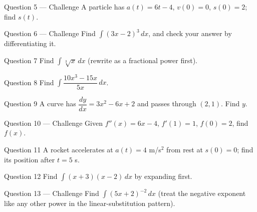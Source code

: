 \documentclass[11pt]{article}
\begin{document}
\begin{qbox}{Question 5 --- Challenge}
A particle has $a(t)=6t-4$, $v(0)=0$, $s(0)=2$; find $s(t)$.\workspace{3.2cm}
\end{qbox}

\begin{qbox}{Question 6 --- Challenge}
Find $\displaystyle\int(3x-2)^3\,dx$, and check your answer by differentiating it.\workspace{3.4cm}
\end{qbox}

\begin{qbox}{Question 7}
Find $\displaystyle\int\sqrt[3]{x}\,dx$ (rewrite as a fractional power first).\workspace{2.4cm}
\end{qbox}

\begin{qbox}{Question 8}
Find $\displaystyle\int\dfrac{10x^3-15x}{5x}\,dx$.\workspace{2.4cm}
\end{qbox}

\begin{qbox}{Question 9}
A curve has $\dfrac{dy}{dx}=3x^2-6x+2$ and passes through $(2,1)$. Find $y$.\workspace{2.4cm}
\end{qbox}

\begin{qbox}{Question 10 --- Challenge}
Given $f''(x)=6x-4$, $f'(1)=1$, $f(0)=2$, find $f(x)$.\workspace{3.4cm}
\end{qbox}

\begin{qbox}{Question 11}
A rocket accelerates at $a(t)=4$ m/s$^2$ from rest at $s(0)=0$; find its position after $t=5$ s.\workspace{2.4cm}
\end{qbox}

\begin{qbox}{Question 12}
Find $\displaystyle\int(x+3)(x-2)\,dx$ by expanding first.\workspace{2.4cm}
\end{qbox}

\begin{qbox}{Question 13 --- Challenge}
Find $\displaystyle\int(5x+2)^{-2}\,dx$ (treat the negative exponent like any other power in the linear-substitution pattern).\workspace{3.2cm}
\end{qbox}

\clearpage
{}
\end{document}
